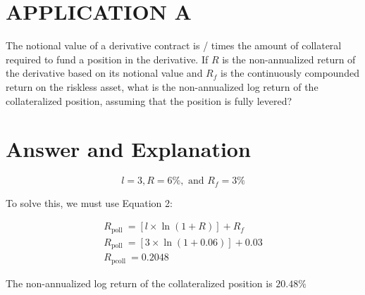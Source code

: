 \documentclass[11pt]{article}
\begin{document}
\section*{APPLICATION A}
The notional value of a derivative contract is / times the amount of collateral required to fund a position in the derivative. If $R$ is the non-annualized return of the derivative based on its notional value and $R_{f}$ is the continuously compounded return on the riskless asset, what is the non-annualized log return of the collateralized position, assuming that the position is fully levered?

\section*{Answer and Explanation}
$$
l=3, R=6 \%, \text { and } R_{f}=3 \%
$$

To solve this, we must use Equation 2:

$$
\begin{gathered}
R_{\text {poll }}=[l \times \ln (1+R)]+R_{f} \\
R_{\text {poll }}=[3 \times \ln (1+0.06)]+0.03 \\
R_{\text {pcoll }}=0.2048
\end{gathered}
$$

The non-annualized log return of the collateralized position is $20.48 \%$
\end{document}
